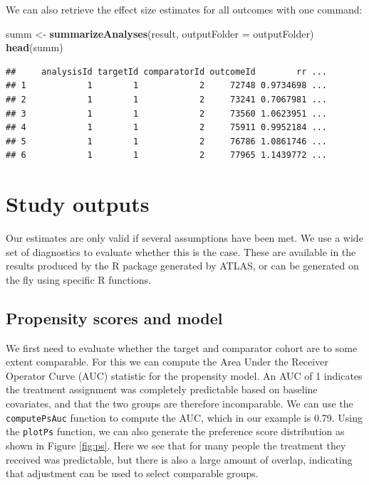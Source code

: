\documentclass[11pt]{book}
\newenvironment{Shaded}{\begin{snugshade}}{\end{snugshade}}
\newcommand{\DataTypeTok}[1]{\textcolor[rgb]{0.13,0.29,0.53}{#1}}
\newcommand{\KeywordTok}[1]{\textcolor[rgb]{0.13,0.29,0.53}{\textbf{#1}}}
\newcommand{\NormalTok}[1]{#1}
\newcommand{\StringTok}[1]{\textcolor[rgb]{0.31,0.60,0.02}{#1}}
\theoremstyle{definition}
\theoremstyle{definition}
\theoremstyle{definition}
\theoremstyle{remark}
\begin{document}
We can also retrieve the effect size estimates for all outcomes with one command:

\begin{Shaded}
\begin{Highlighting}[]
\NormalTok{summ <-}\StringTok{ }\KeywordTok{summarizeAnalyses}\NormalTok{(result, }\DataTypeTok{outputFolder =}\NormalTok{ outputFolder)}
\KeywordTok{head}\NormalTok{(summ)}
\end{Highlighting}
\end{Shaded}

\begin{verbatim}
##     analysisId targetId comparatorId outcomeId        rr ...
## 1            1        1            2     72748 0.9734698 ...
## 2            1        1            2     73241 0.7067981 ...
## 3            1        1            2     73560 1.0623951 ...
## 4            1        1            2     75911 0.9952184 ...
## 5            1        1            2     76786 1.0861746 ...
## 6            1        1            2     77965 1.1439772 ...
\end{verbatim}

\hypertarget{studyOutputs}{%
\section{Study outputs}\label{studyOutputs}}

Our estimates are only valid if several assumptions have been met. We use a wide set of diagnostics to evaluate whether this is the case. These are available in the results produced by the R package generated by ATLAS, or can be generated on the fly using specific R functions.

\hypertarget{propensity-scores-and-model}{%
\subsection{Propensity scores and model}\label{propensity-scores-and-model}}

We first need to evaluate whether the target and comparator cohort are to some extent comparable. For this we can compute the Area Under the Receiver Operator Curve (AUC) statistic for the propensity model. An AUC of 1 indicates the treatment assignment was completely predictable based on baseline covariates, and that the two groups are therefore incomparable. We can use the \texttt{computePsAuc} function to compute the AUC, which in our example is 0.79. Using the \texttt{plotPs} function, we can also generate the preference score distribution as shown in Figure \ref{fig:ps}. Here we see that for many people the treatment they received was predictable, but there is also a large amount of overlap, indicating that adjustment can be used to select comparable groups. 
\end{document}
